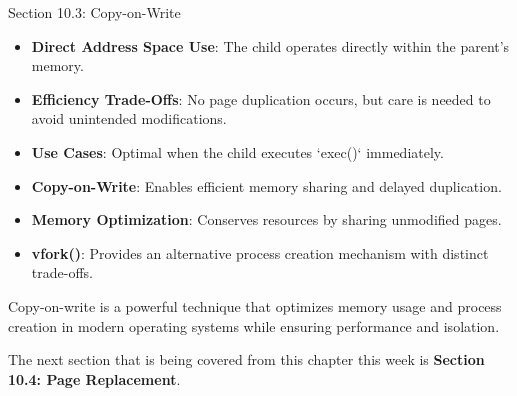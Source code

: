 \begin{notes}{Section 10.3: Copy-on-Write}
    \begin{highlight}
    
    \begin{itemize}
        \item \textbf{Direct Address Space Use}: The child operates directly within the parent's memory.
        \item \textbf{Efficiency Trade-Offs}: No page duplication occurs, but care is needed to avoid unintended modifications.
        \item \textbf{Use Cases}: Optimal when the child executes `exec()` immediately.
    \end{itemize}
    
    \end{highlight}
    
    \begin{highlight}
    
    \begin{itemize}
        \item \textbf{Copy-on-Write}: Enables efficient memory sharing and delayed duplication.
        \item \textbf{Memory Optimization}: Conserves resources by sharing unmodified pages.
        \item \textbf{vfork()}: Provides an alternative process creation mechanism with distinct trade-offs.
    \end{itemize}
    
    Copy-on-write is a powerful technique that optimizes memory usage and process creation in modern operating systems while ensuring performance and isolation.
    \end{highlight}
\end{notes}

The next section that is being covered from this chapter this week is \textbf{Section 10.4: Page Replacement}.

